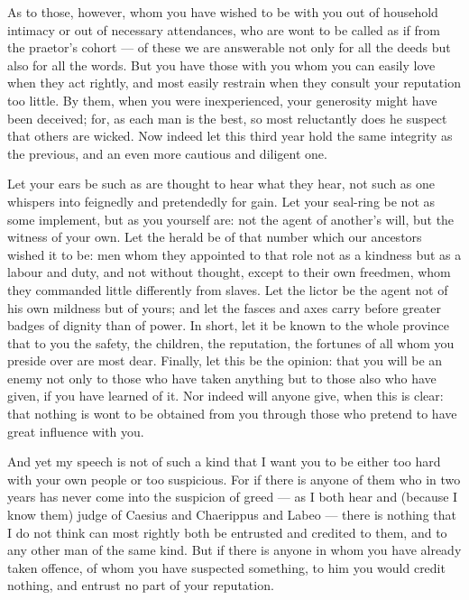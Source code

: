 As to those, however, whom you have wished to be with you out of household intimacy or out of necessary attendances, who are wont to be called as if from the praetor's cohort --- of these we are answerable not only for all the deeds but also for all the words. But you have those with you whom you can easily love when they act rightly, and most easily restrain when they consult your reputation too little. By them, when you were inexperienced, your generosity might have been deceived; for, as each man is the best, so most reluctantly does he suspect that others are wicked. Now indeed let this third year hold the same integrity as the previous, and an even more cautious and diligent one.

 Let your ears be such as are thought to hear what they hear, not such as one whispers into feignedly and pretendedly for gain. Let your seal-ring be not as some implement, but as you yourself are: not the agent of another's will, but the witness of your own. Let the herald be of that number which our ancestors wished it to be: men whom they appointed to that role not as a kindness but as a labour and duty, and not without thought, except to their own freedmen, whom they commanded little differently from slaves. Let the lictor be the agent not of his own mildness but of yours; and let the fasces and axes carry before greater badges of dignity than of power. In short, let it be known to the whole province that to you the safety, the children, the reputation, the fortunes of all whom you preside over are most dear. Finally, let this be the opinion: that you will be an enemy not only to those who have taken anything but to those also who have given, if you have learned of it. Nor indeed will anyone give, when this is clear: that nothing is wont to be obtained from you through those who pretend to have great influence with you.

 And yet my speech is not of such a kind that I want you to be either too hard with your own people or too suspicious. For if there is anyone of them who in two years has never come into the suspicion of greed --- as I both hear and (because I know them) judge of Caesius and Chaerippus and Labeo --- there is nothing that I do not think can most rightly both be entrusted and credited to them, and to any other man of the same kind. But if there is anyone in whom you have already taken offence, of whom you have suspected something, to him you would credit nothing, and entrust no part of your reputation.

